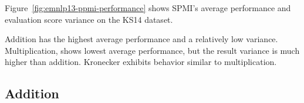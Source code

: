 \documentclass[11pt,letterpaper]{article}
\begin{document}
Figure~\ref{fig:emnlp13-ppmi-performance} shows SPMI's average performance and evaluation score variance on the KS14 dataset.

Addition has the highest average performance and a relatively low variance. Multiplication, shows lowest average performance, but the result variance is much higher than addition. Kronecker exhibits behavior similar to multiplication.

\subsection{Addition}
\label{sec:addition}





%

% 
\balance

\end{document}
